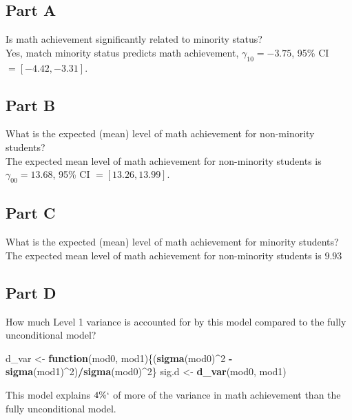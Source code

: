\documentclass[]{article}
\newenvironment{Shaded}{\begin{snugshade}}{\end{snugshade}}
\newcommand{\KeywordTok}[1]{\textcolor[rgb]{0.13,0.29,0.53}{\textbf{#1}}}
\newcommand{\DecValTok}[1]{\textcolor[rgb]{0.00,0.00,0.81}{#1}}
\newcommand{\StringTok}[1]{\textcolor[rgb]{0.31,0.60,0.02}{#1}}
\newcommand{\ControlFlowTok}[1]{\textcolor[rgb]{0.13,0.29,0.53}{\textbf{#1}}}
\newcommand{\OperatorTok}[1]{\textcolor[rgb]{0.81,0.36,0.00}{\textbf{#1}}}
\newcommand{\NormalTok}[1]{#1}
\begin{document}
\subsection{Part A}\label{part-a}

Is math achievement significantly related to minority status?\\
Yes, match minority status predicts math achievement,
\(\gamma_{10} = -3.75\), 95\% CI \(= [-4.42, -3.31]\).

\subsection{Part B}\label{part-b}

What is the expected (mean) level of math achievement for non-minority
students?\\
The expected mean level of math achievement for non-minority students is
\(\gamma_{00} = 13.68\), 95\% CI \(= [13.26, 13.99]\).

\subsection{Part C}\label{part-c}

What is the expected (mean) level of math achievement for minority
students?\\
The expected mean level of math achievement for non-minority students is
\(9.93\)

\subsection{Part D}\label{part-d}

How much Level 1 variance is accounted for by this model compared to the
fully unconditional model?

\begin{Shaded}
\begin{Highlighting}[]
\NormalTok{d_var <-}\StringTok{ }\ControlFlowTok{function}\NormalTok{(mod0, mod1)\{(}\KeywordTok{sigma}\NormalTok{(mod0)}\OperatorTok{^}\DecValTok{2} \OperatorTok{-}\StringTok{ }\KeywordTok{sigma}\NormalTok{(mod1)}\OperatorTok{^}\DecValTok{2}\NormalTok{)}\OperatorTok{/}\KeywordTok{sigma}\NormalTok{(mod0)}\OperatorTok{^}\DecValTok{2}\NormalTok{\}}
\NormalTok{sig.d <-}\StringTok{ }\KeywordTok{d_var}\NormalTok{(mod0, mod1)}
\end{Highlighting}
\end{Shaded}

This model explains \(4\%`\) of more of the variance in math achievement
than the fully unconditional model.
\end{document}
